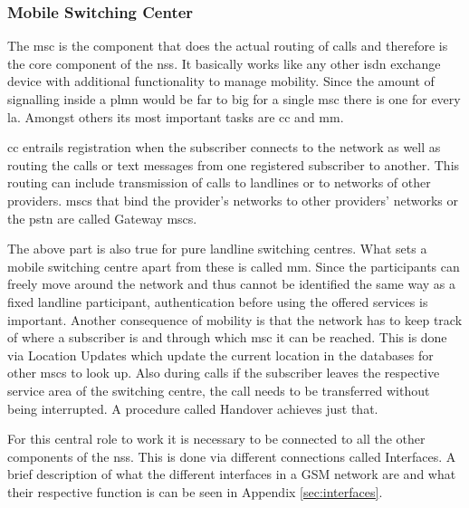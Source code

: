 \subsubsection{Mobile Switching Center}
The \gls{msc} is the component that does the actual routing of calls and therefore is the core component of the \gls{nss}.
It basically works like any other \gls{isdn} exchange device with additional functionality to manage mobility.
Since the amount of signalling inside a \gls{plmn} would be far to big for a single \gls{msc} there is one for every \gls{la}.
Amongst others its most important tasks are \gls{cc} and \gls{mm}.

\gls{cc} entrails registration when the subscriber connects to the network as well as routing the calls or text messages from one registered subscriber to another. 
This routing can include transmission of calls to landlines or to networks of other providers.
\glspl{msc} that bind the provider's networks to other providers' networks or the \gls{pstn} are called Gateway \glspl{msc}.

The above part is also true for pure landline switching centres.
What sets a mobile switching centre apart from these is called \gls{mm}.
Since the participants can freely move around the network  and thus cannot be identified the same way as a fixed landline participant, authentication before using the offered services is important.
Another consequence of mobility is that the network has to keep track of where a subscriber is and through which \gls{msc} it can be reached.
This is done via  Location Updates which update the current location in the databases for other \glspl{msc} to look up.
Also during calls if the subscriber leaves the respective service area of the switching centre, the call needs to be transferred without being interrupted.
A procedure called Handover achieves just that.

For this central role to work it is necessary to be connected to all the other components of the \gls{nss}.
This is done via different connections called Interfaces.
A brief description of what the different interfaces in a GSM network are and what their respective function is can be seen in Appendix \ref{sec:interfaces}.

